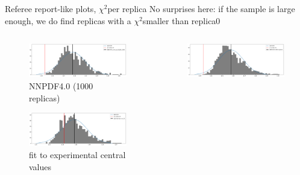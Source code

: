 \documentclass[aspectratio=169,10pt]{beamer}
\newcommand{\chitwo}{$\chi^2$}
\begin{document}
\begin{frame}[t]{Referee report-like plots, \chitwo per replica}
  \vspace*{-0.1cm}
  No surprises here: if the sample is large enough, we do find replicas with a \chitwo smaller than replica0\\
  \begin{columns}
    \begin{column}{0.5\textwidth}
      \begin{figure}
        \includegraphics[height=.3\textheight]{chi2_replicas_nnpdf40_1000.png}
        \caption*{\footnotesize NNPDF4.0 (1000 replicas)}
      \end{figure}
      \vspace*{-0.8cm}
      \begin{figure}
        \includegraphics[height=.3\textheight]{chi2_replicas_level1_fit.png}
        \caption*{\footnotesize  fit to experimental central values}
      \end{figure}
    \end{column}
    \begin{column}{0.5\textwidth}
      \begin{figure}
        \includegraphics[height=.3\textheight]{chi2_replicas_nnpdf40_3000.png}

\end{figure}
\end{column}
\end{columns}
\end{frame}
\end{document}
